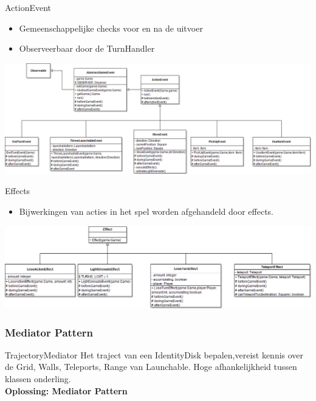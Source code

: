 \documentclass[t]{beamer}
\begin{document}
\begin{frame}{ActionEvent}
\begin{center}
\begin{itemize}
	\item Gemeenschappelijke checks voor en na de uitvoer
	\item Observeerbaar door de TurnHandler
\end{itemize}
\vspace{0.1in}
\includegraphics[width=1\linewidth]{images/ActionEvents}
\end{center}
\end{frame}

\begin{frame}{Effects}
\begin{center}
\begin{itemize}
\item Bijwerkingen van acties in het spel worden afgehandeld door effects.
\end{itemize}
\vspace{0.3in}
\includegraphics[width=1\linewidth]{images/Effects}
\end{center}
\end{frame}

\subsubsection{Mediator Pattern}
\begin{frame}{TrajectoryMediator}
Het traject van een IdentityDisk bepalen,vereist kennis over de Grid, Walls, Teleports, Range van Launchable. Hoge afhankelijkheid tussen klassen onderling.\\
\textbf{Oplossing: Mediator Pattern}
\begin{center}
\end{center}
\end{frame}
\end{document}
